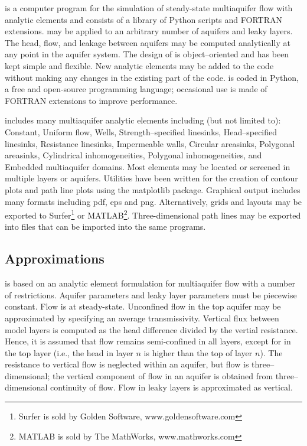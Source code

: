 \documentclass [10pt,letterpaper] {article}
\begin{document}
\Timsp is a computer program for the simulation of steady-state
multiaquifer flow with analytic elements and consists of a
library of Python scripts and FORTRAN extensions. \Timsp may be applied to an arbitrary number
of aquifers and leaky layers. The head, flow, and leakage between
aquifers may be computed analytically at any point in the aquifer
system. The design of \Timsp is object--oriented and has been kept
simple and flexible. New analytic elements may be added to the
code without making any changes in the existing part of the code.
\Timsp is coded in Python, a free and open-source
programming language; occasional use is made of
FORTRAN extensions to improve performance.

\Timsp includes many multiaquifer analytic
elements including (but not limited to): Constant, Uniform flow, Wells,
Strength--specified linesinks, Head--specified linesinks, Resistance
linesinks, Impermeable walls, Circular areasinks, Polygonal areasinks, Cylindrical
inhomogeneities, Polygonal inhomogeneities, and Embedded multiaquifer domains. Most elements may be located or
screened in multiple layers or aquifers. Utilities have been written for the creation of contour plots and path line plots using the matplotlib package.
Graphical output includes many formats including pdf, eps and png.  Alternatively, grids and layouts may be exported to
Surfer\footnote{Surfer is sold by Golden Software, www.goldensoftware.com} or
MATLAB\footnote{MATLAB is sold by The MathWorks, www.mathworks.com}.
Three-dimensional path lines may be exported into files that can be
imported into the same programs.

\subsection{Approximations}
\Timsp is based on an analytic element formulation for multiaquifer flow with a
number of restrictions. Aquifer parameters and leaky layer parameters must be
piecewise constant. Flow is at steady-state. Unconfined flow in the top aquifer may be approximated by
specifying an average transmissivity. Vertical flux between model layers is computed as the head difference divided by the vertial resistance. Hence, it is assumed that flow remains semi-confined in all layers, except
for in the top layer (i.e., the head in layer $n$ is higher than the top of layer $n$).
The resistance to vertical flow is
neglected within an aquifer, but flow is three--dimensional; the vertical
component of flow in an aquifer is obtained from three--dimensional continuity
of flow. Flow in leaky layers is approximated as vertical.
\end{document}
